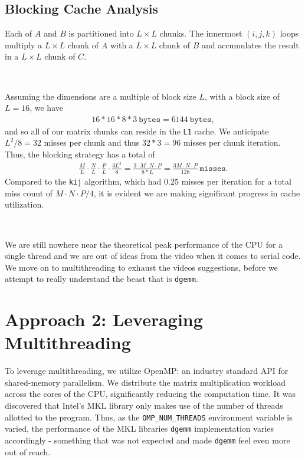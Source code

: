 \documentclass{article}
\begin{document}
\subsection{Blocking Cache Analysis}
Each of $A$ and $B$ is partitioned into $L \times L$ chunks. 
The innermost $(i,j,k)$ loops multiply a $L \times L$ chunk of $A$ with a
$L \times L$ chunk of $B$ and accumulates the 
result in a $L \times L$ chunk of $C$.

\

\noindent Assuming the dimensions are a multiple of block size $L$, with a block size of $L = 16$, we have 
\begin{align*}
    16 * 16 * 8 * 3 \ \texttt{bytes} = 6144\ \texttt{bytes},
\end{align*}
and so all of our matrix chunks can reside in the \texttt{L1} cache. We anticipate 
$L^2 / 8 = 32$ misses per chunk and thus $32 * 3 = 96$ misses per chunk iteration. 
Thus, the blocking strategy has a total of 
\begin{align*}
    \frac{M}{L} \cdot \frac{N}{L} \cdot \frac{P}{L} \cdot \frac{3 L^2}{8} = \frac{3 \cdot M \cdot N \cdot P}{8 * L} = \frac{3M\cdot N \cdot P}{128}\ \texttt{misses}.
\end{align*}
Compared to the \texttt{kij} algorithm, which had $0.25$ misses per iteration for a total miss count of $M\cdot N \cdot P / 4$, it 
is evident we are making significant progress in cache utilization.

\

\noindent We are still nowhere near the theoretical peak performance of the CPU for a single thread and we are 
out of ideas from the video when it comes to serial code. We move on to multithreading 
to exhaust the videos suggestions, before we attempt to really understand the beast that is \texttt{dgemm}.

\section{Approach 2: Leveraging Multithreading}

To leverage multithreading, we utilize OpenMP: an industry standard API for 
shared-memory parallelism. We distribute the matrix multiplication workload 
across the cores of the CPU, significantly reducing the computation time. 
It was discovered that Intel's MKL library only makes use of the number of 
threads allotted to the program. Thus, as the \texttt{OMP\_NUM\_THREADS} environment variable is varied, 
the performance of the MKL libraries \texttt{dgemm} implementation varies accordingly 
- something that was not expected and made \texttt{dgemm} feel even more out of reach.
\end{document}
